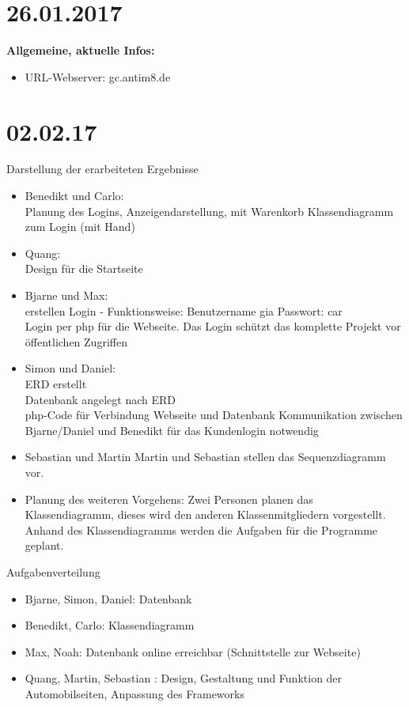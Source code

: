 \documentclass[11pt,a4paper]{book}
\begin{document}
\section*{26.01.2017}
\textbf{Allgemeine, aktuelle Infos:}
\begin{itemize}
\item URL-Webserver: gc.antim8.de
\end{itemize}
\section*{02.02.17}
\Large{Darstellung der erarbeiteten Ergebnisse}
\normalsize
\begin{itemize}
\item Benedikt und Carlo: \\
Planung des Logins, Anzeigendarstellung, mit Warenkorb
Klassendiagramm zum Login (mit Hand)
\item Quang: \\
Design für die Startseite
\item Bjarne und Max: \\
erstellen Login - Funktionsweise: Benutzername gia  Passwort:  car\\
Login per php für die Webseite. Das Login schützt das komplette Projekt vor öffentlichen Zugriffen
\item Simon und Daniel: \\
ERD erstellt\\
Datenbank angelegt nach ERD \\
php-Code für Verbindung Webseite und Datenbank
Kommunikation zwischen Bjarne/Daniel und Benedikt für das Kundenlogin notwendig
\item Sebastian und Martin
Martin und Sebastian stellen das Sequenzdiagramm vor.
\item Planung des weiteren Vorgehens:
Zwei Personen planen das Klassendiagramm, dieses wird den anderen Klassenmitgliedern vorgestellt. Anhand des Klassendiagramms werden die Aufgaben für die Programme geplant.
\end{itemize}
\vspace*{1cm}
\Large{Aufgabenverteilung}
\normalsize
\begin{itemize}
\item Bjarne, Simon, Daniel: Datenbank
\item Benedikt, Carlo: Klassendiagramm
\item Max, Noah: Datenbank online erreichbar (Schnittstelle zur Webseite)
\item Quang, Martin, Sebastian : Design, Gestaltung und Funktion der Automobilseiten, Anpassung des Frameworks

\end{itemize}
\end{document}
